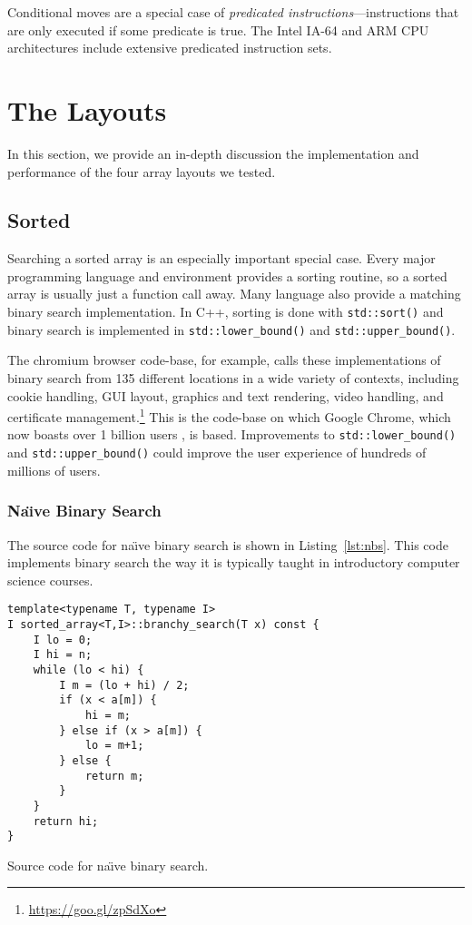 \documentclass{patmorin}
\newcommand{\lstlabel}[1]{\label{lst:#1}}
\newcommand{\lstref}[1]{Listing~\ref{lst:#1}}
\begin{document}
Conditional moves are a special case of \emph{predicated
instructions}---instructions that are only executed if some predicate
is true.  The Intel IA-64 and ARM CPU architectures include extensive
predicated instruction sets.

\section{The Layouts}

In this section, we provide an in-depth discussion the implementation
and performance of the four array layouts we tested.

\subsection{Sorted}

Searching a sorted array is an especially important special case. Every
major programming language and environment provides a sorting routine,
so a sorted array is usually just a function call away. Many language
also provide a matching binary search implementation.  In C++,
sorting is done with \texttt{std::sort()} and binary
search is implemented in \texttt{std::lower_bound()} and
\texttt{std::upper_bound()}. 

The chromium browser code-base, for example, calls these
implementations of binary search from 135 different locations
in a wide variety of contexts, including cookie handling, GUI
layout, graphics and text rendering, video handling, and certificate
management.\footnote{\url{https://goo.gl/zpSdXo}}  This is the code-base
on which Google Chrome, which now boasts over 1 billion users \cite{X}, is
based. Improvements to \texttt{std::lower_bound()}
and \texttt{std::upper_bound()} could improve the user experience
of hundreds of millions of users.

\subsubsection{Na\"{\i}ve Binary Search}

The source code for na\"{\i}ve binary search is shown in
\lstref{nbs}. This code implements binary search the way it is typically
taught in introductory computer science courses.

\begin{listing}
\begin{verbatim}
template<typename T, typename I>
I sorted_array<T,I>::branchy_search(T x) const {
    I lo = 0;
    I hi = n;
    while (lo < hi) {
        I m = (lo + hi) / 2;
        if (x < a[m]) {
            hi = m;
        } else if (x > a[m]) {
            lo = m+1;
        } else {
            return m;
        }
    }
    return hi;
}
\end{verbatim}
\caption{Source code for na\"{\i}ve binary search.}
\lstlabel{nbs}
\end{listing}
\end{document}
